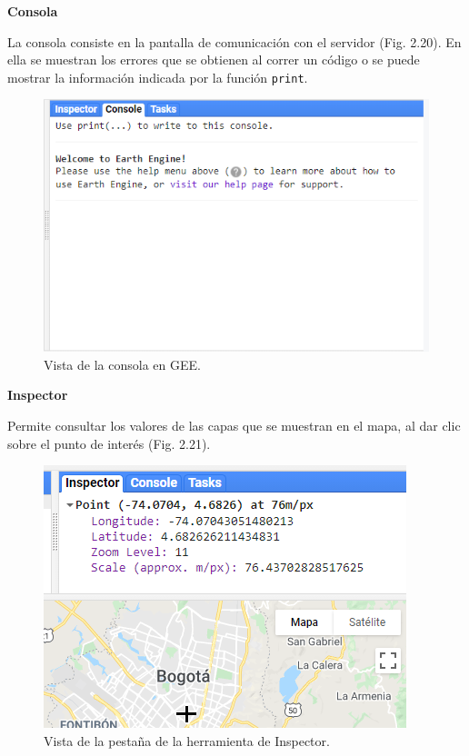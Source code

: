 \documentclass[
  12pt,
  letterpaper,
  twoside]{book}
\begin{document}
\textbf{Consola}

La consola consiste en la pantalla de comunicación con el servidor (Fig. 2.20). En ella se muestran los errores que se obtienen al correr un código o se puede mostrar la información indicada por la función \texttt{print}.

\begin{figure}[btp]

{\centering \includegraphics[width=0.8\linewidth]{Img/rigthPanel} 

}

\caption{Vista de la consola en GEE.}\label{fig:unnamed-chunk-21}
\end{figure}

\textbf{Inspector}

Permite consultar los valores de las capas que se muestran en el mapa, al dar clic sobre el punto de interés (Fig. 2.21).

\begin{figure}[btp]

{\centering \includegraphics[width=0.8\linewidth]{Img/inspector} 

}

\caption{Vista de la pestaña de la herramienta de Inspector.}\label{fig:unnamed-chunk-22}
\end{figure}
\end{document}
